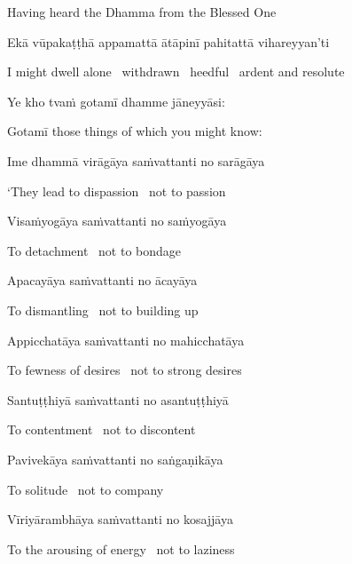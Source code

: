 \begin{english}
  Having heard the Dhamma from the Blessed One
\end{english}

Ekā vūpakaṭṭhā appamattā ātāpinī pahitattā vihareyyan'ti

\begin{english}
  I might dwell alone \breathmark\ withdrawn \breathmark\ heedful \breathmark\ ardent and resolute
\end{english}

Ye kho tvaṁ gotamī dhamme jāneyyāsi:

\begin{english}
  Gotamī those things of which you might know:
\end{english}

Ime dhammā virāgāya saṁvattanti no sarāgāya

\begin{english}
  `They lead to dispassion \breathmark\ not to passion
\end{english}

Visaṁyogāya saṁvattanti no saṁyogāya

\begin{english}
  To detachment \breathmark\ not to bondage
\end{english}

Apacayāya saṁvattanti no ācayāya

\begin{english}
  To dismantling \breathmark\ not to building up
\end{english}

Appicchatāya saṁvattanti no mahicchatāya

\begin{english}
  To fewness of desires \breathmark\ not to strong desires
\end{english}

Santuṭṭhiyā saṁvattanti no asantuṭṭhiyā

\begin{english}
  To contentment \breathmark\ not to discontent
\end{english}

Pavivekāya saṁvattanti no saṅgaṇikāya

\begin{english}
  To solitude \breathmark\ not to company
\end{english}

Vīriyārambhāya saṁvattanti no kosajjāya

\begin{english}
  To the arousing of energy \breathmark\ not to laziness
\end{english}

